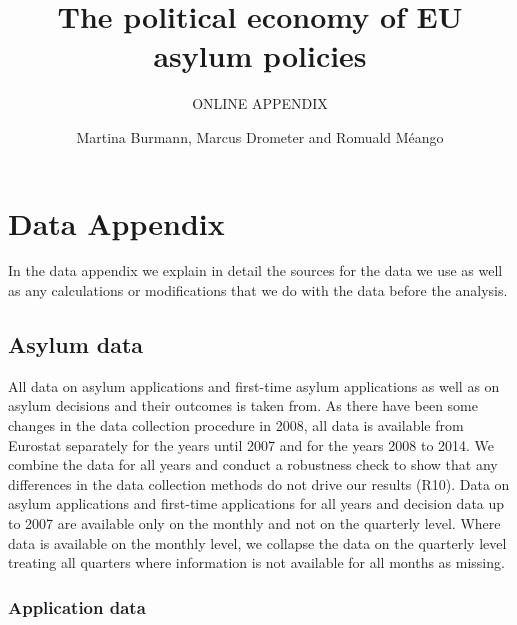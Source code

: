 \documentclass[11pt,a4paper]{scrartcl}
\begin{document}
	\title{The political economy of EU asylum policies}
	\subtitle{ONLINE APPENDIX}
	\author{Martina Burmann, Marcus Drometer and Romuald Méango}
	\maketitle

\tableofcontents

\clearpage
\FloatBarrier
\section{Data Appendix}
In the data appendix we explain in detail the sources for the data we use as well as any calculations or modifications that we do with the data before the analysis. 

\subsection{Asylum data}
All data on asylum applications and first-time asylum applications as well as on asylum decisions and their outcomes is taken from\textcites{Eurostat2015, Eurostat2017a, Eurostat2017b, Eurostat2017c, Eurostat2017d, Eurostat2018a, Eurostat2018b, Eurostat2018c}. As there have been some changes in the data collection procedure in 2008, all data is available from Eurostat separately for the years until 2007 and for the years 2008 to 2014. We combine the data for all years and conduct a robustness check to show that any differences in the data collection methods do not drive our results (R10). Data on asylum applications and first-time applications for all years and decision data up to 2007 are available only on the monthly and not on the quarterly level. Where data is available on the monthly level, we collapse the data on the quarterly level treating all quarters where information is not available for all months as missing. 

\subsubsection{Application data}
\end{document}
